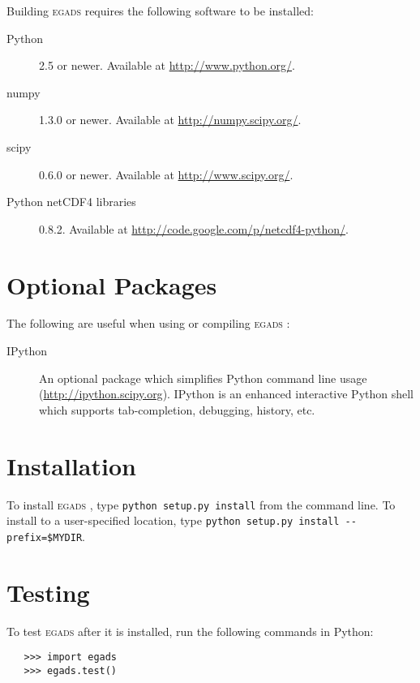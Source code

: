\documentclass[a4paper,11pt]{report}
\newcommand{\egads}{\textsc{egads} }
\begin{document}
Building \egads requires the following software to be installed:

\begin{description}
 \item[Python] 2.5 or newer. Available at \href{http://www.python.org/}{http://www.python.org/}.
 \item[numpy] 1.3.0 or newer. Available at \href{http://numpy.scipy.org/}{http://numpy.scipy.org/}.
 \item[scipy] 0.6.0 or newer. Available at \href{http://www.scipy.org/}{http://www.scipy.org/}.
 \item[Python netCDF4 libraries] 0.8.2. Available at \href{http://code.google.com/p/netcdf4-python/}{http://code.google.com/p/netcdf4-python/}.
\end{description}

\section{Optional Packages}

The following are useful when using or compiling \egads:

\begin{description}
 \item[IPython] An optional package which simplifies Python command line usage (\href{http://ipython.scipy.org}{http://ipython.scipy.org}). IPython is an enhanced interactive Python shell which supports tab-completion, debugging, history, etc. 

 \end{description}

\section{Installation}
To install \egads, type \verb|python setup.py install| from the command line. To install to a user-specified location, type \verb|python setup.py install --prefix=$MYDIR|. 

\section{Testing}

To test \egads after it is installed, run the following commands in Python:

\begin{verbatim}
   >>> import egads
   >>> egads.test()
\end{verbatim} 
\end{document}
